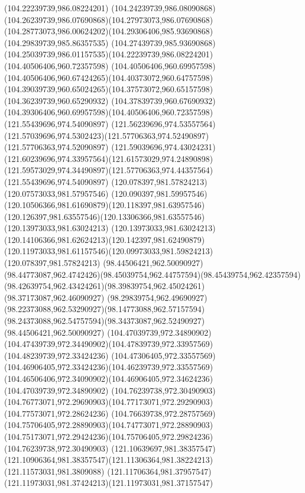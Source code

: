 {{  \moveto(104.22239739,986.08224201)
  \curveto(104.24239739,986.08090868)(104.26239739,986.07690868)(104.27973073,986.07690868)
  \curveto(104.28773073,986.00624202)(104.29306406,985.93690868)(104.29839739,985.86357535)
  \curveto(104.27439739,985.93690868)(104.25039739,986.01157535)(104.22239739,986.08224201)
  \moveto(104.40506406,960.72357598)
  \curveto(104.40506406,960.69957598)(104.40506406,960.67424265)(104.40373072,960.64757598)
  \curveto(104.39039739,960.65024265)(104.37573072,960.65157598)(104.36239739,960.65290932)
  \curveto(104.37839739,960.67690932)(104.39306406,960.69957598)(104.40506406,960.72357598)
  \moveto(121.55439696,974.54090897)
  \curveto(121.56239696,974.53557564)(121.57039696,974.5302423)(121.57706363,974.52490897)
  \lineto(121.57706363,974.52090897)
  \curveto(121.59039696,974.43024231)(121.60239696,974.33957564)(121.61573029,974.24890898)
  \curveto(121.59573029,974.34490897)(121.57706363,974.44357564)(121.55439696,974.54090897)
  \moveto(120.078397,981.57824213)
  \lineto(120.07573033,981.57957546)
  \curveto(120.090397,981.59957546)(120.10506366,981.61690879)(120.118397,981.63957546)
  \curveto(120.126397,981.63557546)(120.13306366,981.63557546)(120.13973033,981.63024213)
  \curveto(120.13973033,981.63024213)(120.14106366,981.62624213)(120.142397,981.62490879)
  \curveto(120.11973033,981.61157546)(120.09973033,981.59824213)(120.078397,981.57824213)
  \moveto(98.44506421,962.50090927)
  \curveto(98.44773087,962.4742426)(98.45039754,962.44757594)(98.45439754,962.42357594)
  \curveto(98.42639754,962.43424261)(98.39839754,962.45024261)(98.37173087,962.46090927)
  \curveto(98.29839754,962.49690927)(98.22373088,962.53290927)(98.14773088,962.57157594)
  \curveto(98.24373088,962.54757594)(98.34373087,962.52490927)(98.44506421,962.50090927)
  \moveto(104.47039739,972.34890902)
  \curveto(104.47439739,972.34490902)(104.47839739,972.33957569)(104.48239739,972.33424236)
  \curveto(104.47306405,972.33557569)(104.46906405,972.33424236)(104.46239739,972.33557569)
  \curveto(104.46506406,972.34090902)(104.46906405,972.34624236)(104.47039739,972.34890902)
  \moveto(104.76239738,972.30490903)
  \curveto(104.76773071,972.29690903)(104.77173071,972.29290903)(104.77573071,972.28624236)
  \curveto(104.76639738,972.28757569)(104.75706405,972.28890903)(104.74773071,972.28890903)
  \curveto(104.75173071,972.29424236)(104.75706405,972.29824236)(104.76239738,972.30490903)
  \moveto(121.10639697,981.38357547)
  \curveto(121.10906364,981.38357547)(121.11306364,981.38224213)(121.11573031,981.3809088)
  \curveto(121.11706364,981.37957547)(121.11973031,981.37424213)(121.11973031,981.37157547)
}}
